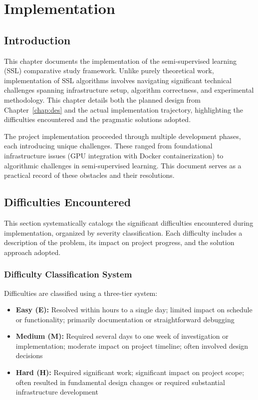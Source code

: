 \chapter{Implementation}
\label{chap:imp}

\section{Introduction}

This chapter documents the implementation of the semi-supervised learning (SSL) comparative study framework. Unlike purely theoretical work, implementation of SSL algorithms involves navigating significant technical challenges spanning infrastructure setup, algorithm correctness, and experimental methodology. This chapter details both the planned design from Chapter~\ref{chap:des} and the actual implementation trajectory, highlighting the difficulties encountered and the pragmatic solutions adopted.

The project implementation proceeded through multiple development phases, each introducing unique challenges. These ranged from foundational infrastructure issues (GPU integration with Docker containerization) to algorithmic challenges in semi-supervised learning. This document serves as a practical record of these obstacles and their resolutions.

\section{Difficulties Encountered}
\label{sec:difficulties}

This section systematically catalogs the significant difficulties encountered during implementation, organized by severity classification. Each difficulty includes a description of the problem, its impact on project progress, and the solution approach adopted.

\subsection{Difficulty Classification System}

Difficulties are classified using a three-tier system:

\begin{itemize}
    \item \textbf{Easy (E):} Resolved within hours to a single day; limited impact on schedule or functionality; primarily documentation or straightforward debugging
    \item \textbf{Medium (M):} Required several days to one week of investigation or implementation; moderate impact on project timeline; often involved design decisions
    \item \textbf{Hard (H):} Required significant work; significant impact on project scope; often resulted in fundamental design changes or required substantial infrastructure development
\end{itemize}

